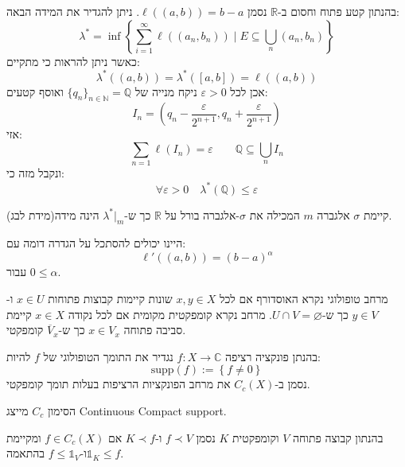 \documentclass{tstextbook}
\begin{document}
\begin{example}
בהנתון קטע פתוח וחסום ב-\(\mathbb{R}\) נסמן \(\ell((a,b))=b-a\). ניתן להגדיר את המידה הבאה:
$$\lambda^{*}=\inf\left\{  \sum_{i=1}^{\infty} \ell((a_{n},b_{n}))\mid E\subseteq \bigcup_{n} (a_{n},b_{n})  \right\}$$
כאשר ניתן להראות כי מתקיים:
$$\lambda^{*}((a,b))=\lambda^{*}([a,b])=\ell((a,b))$$
אכן לכל \(\varepsilon>0\) ניקח מנייה של \(\{ q_{n} \}_{n \in \mathbb{N}}=\mathbb{Q}\) ואוסף קטעים:
$$I_{n}=\left( q_{n}-\frac{\varepsilon}{2^{n+1}},q_{n}+\frac{\varepsilon}{2^{n+1}} \right)$$
אזי:
$$\sum_{n=1}\ell(I_{n})=\varepsilon \qquad  \mathbb{Q} \subseteq \bigcup_{n}I_{n}$$
ונקבל מזה כי:
$$\forall\varepsilon>0 \quad \lambda^{*}\left( \mathbb{Q}  \right)\leq \varepsilon$$

\end{example}
\begin{theorem}
קיימת \(\sigma\) אלגברה \(m\) המכילה את \(\sigma\)-אלגברה בורל על \(\mathbb{R}\) כך ש-\(\lambda^{*}|_{m}\) הינה מידה(מידת לבג).

\end{theorem}
\begin{remark}
היינו יכולים להסתכל על הגדרה דומה עם:
$$\ell'((a,b))=(b-a)^{\alpha}$$
עבור \(0\leq \alpha\).

\end{remark}
\begin{reminder}
מרחב טופולוגי נקרא האוסדורף אם לכל \(x,y \in X\) שונות קיימות קבוצות פתוחות \(x \in U\) ו-\(y\in V\) כך ש-\(U\cap V = \varnothing\).
מרחב נקרא קומפקטית מקומית אם לכל נקודה \(x \in X\) קיימת סביבה פתוחה \(x \in V_{x}\) כך ש-\(\overline{V}_{x}\) קומפקטי.

\end{reminder}
\begin{definition}
בהנתן פונקציה רציפה \(f:X\to \mathbb{C}\) נגדיר את התומך הטופולוגי של \(f\) להיות:
$$\mathrm{supp}(f):= \left\{  f\neq 0  \right\}$$
נסמן ב-\(C_{c}(X)\) את מרחב הפונקציות הרציפות בעלות תומך קומפקטי.

\end{definition}
\begin{remark}
הסימון \(C_{c}\) מייצג Continuous Compact support.

\end{remark}
\begin{symbolize}
בהנתון קבוצה פתוחה \(V\) וקומפקטית \(K\) נסמן \(f \prec V\) ו-\(K\prec f\) אם \(f \in C_{c}(X)\) ומקיימת \(\mathbb{1}_{K} \leq f\)ו-\(f\leq \mathbb{1} _{V}\) בהתאמה.

\end{symbolize}
\end{document}
